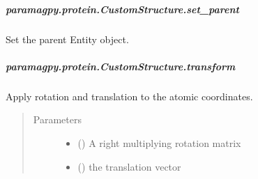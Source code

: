 \documentclass[a4paper,10pt,english,openany,oneside]{sphinxmanual}
\begin{document}
\begin{fulllineitems}
\begin{fulllineitems}
\subparagraph{paramagpy.protein.CustomStructure.set\_parent}
\label{\detokenize{reference/generated/paramagpy.protein.CustomStructure.set_parent:paramagpy-protein-customstructure-set-parent}}\label{\detokenize{reference/generated/paramagpy.protein.CustomStructure.set_parent::doc}}

\begin{fulllineitems}
\label{\detokenize{reference/generated/paramagpy.protein.CustomStructure.set_parent:paramagpy.protein.CustomStructure.set_parent}}
\sphinxAtStartPar
Set the parent Entity object.

\end{fulllineitems}



\subparagraph{paramagpy.protein.CustomStructure.transform}
\label{\detokenize{reference/generated/paramagpy.protein.CustomStructure.transform:paramagpy-protein-customstructure-transform}}\label{\detokenize{reference/generated/paramagpy.protein.CustomStructure.transform::doc}}

\begin{fulllineitems}
\label{\detokenize{reference/generated/paramagpy.protein.CustomStructure.transform:paramagpy.protein.CustomStructure.transform}}
\sphinxAtStartPar
Apply rotation and translation to the atomic coordinates.
\begin{quote}\begin{description}
\item[{Parameters}] \leavevmode\begin{itemize}
\item {} 
\sphinxAtStartPar
{} () \textendash{} A right multiplying rotation matrix

\item {} 
\sphinxAtStartPar
{} () \textendash{} the translation vector


\end{itemize}
\end{description}
\end{quote}
\end{fulllineitems}
\end{fulllineitems}
\end{fulllineitems}
\end{document}
